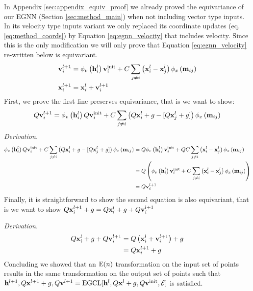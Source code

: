 In Appendix \ref{sec:appendix_equiv_proof} we already proved the equivariance of our EGNN (Section \ref{sec:method_main}) when not including vector type inputs. In its velocity type inputs variant we only replaced its coordinate updates (eq. \ref{eq:method_coords}) by Equation \ref{eq:egnn_velocity} that includes velocity. Since this is the only modification we will only prove that Equation \ref{eq:egnn_velocity} re-written below is equivariant.
\begin{align*}
     \mathbf{v}_{i}^{l+1}&= \phi_{v}\left(\mathbf{h}_{i}^l\right)\mathbf{v}_{i}^{\text{init}} +C\sum_{j \neq i}\left(\mathbf{x}_{i}^{l}-\mathbf{x}_{j}^{l}\right) \phi_{x}\left(\mathbf{m}_{i j}\right) \\
\mathbf{x}_{i}^{l+1} &=\mathbf{x}_{i}^{l}+ \mathbf{v}_i^{l+1} \\
\end{align*}
%
First, we prove the first line preserves equivariance, that is we want to show: $$Q\mathbf{v}_{i}^{l+1} = \phi_{v}\left(\mathbf{h}_{i}^l\right)Q\mathbf{v}_{i}^{\text{init}} +C\sum_{j \neq i}\left(Q\mathbf{x}_{i}^{l} + g - [Q\mathbf{x}_{j}^{l} + g]\right) \phi_{x}\left(\mathbf{m}_{i j}\right)$$
\textit{Derivation.}
\begin{align}
    \phi_{v}\left(\mathbf{h}_{i}^l\right)Q\mathbf{v}_{i}^{\text{init}} +C\sum_{j \neq i}\left(Q\mathbf{x}_{i}^{l} + g - [Q\mathbf{x}_{j}^{l} + g]\right) \phi_{x}\left(\mathbf{m}_{i j}\right)
    &= Q\phi_{v}\left(\mathbf{h}_{i}^l\right)\mathbf{v}_{i}^{\text{init}} +QC\sum_{j \neq i}\left(\mathbf{x}_{i}^{l} - \mathbf{x}_{j}^{l}  \right) \phi_{x}\left(\mathbf{m}_{i j}\right) \\
        &= Q\left(\phi_{v}\left(\mathbf{h}_{i}^l\right)\mathbf{v}_{i}^{\text{init}} +C\sum_{j \neq i}\left(\mathbf{x}_{i}^{l} - \mathbf{x}_{j}^{l}  \right) \phi_{x}\left(\mathbf{m}_{i j}\right)\right) \\
        &= Q\mathbf{v}_{i}^{l+1}
\end{align}
Finally, it is straightforward to show the second equation is also equivariant, that is we want to show $Q\mathbf{x}_{i}^{l+1} + g = Q\mathbf{x}_{i}^{l}+ g + Q\mathbf{v}_i^{l+1}$

\textit{Derivation.}
\begin{align*}
    Q\mathbf{x}_{i}^{l}+ g + Q\mathbf{v}_i^{l+1} &= Q\left (\mathbf{x}_{i}^{l} +\mathbf{v}_i^{l+1} \right ) +g \\
    &= Q\mathbf{x}_{i}^{l+1} + g
\end{align*}
Concluding we showed that an $\mathrm{E}(n)$ transformation on the input set of points results in the same transformation on the output set of points such that $\mathbf{h}^{l+1}, Q\mathbf{x}^{l+1} + g, Q\mathbf{v}^{l+1} = \text{EGCL}[\mathbf{h}^{l}, Q\mathbf{x}^{l} + g, Q\mathbf{v}^{\text{init}}, \mathcal{E}]$ is satisfied.





